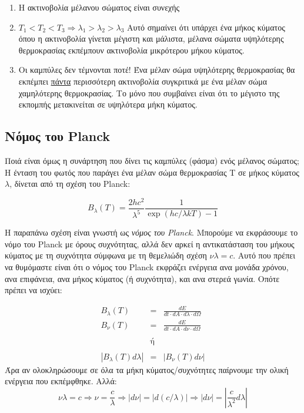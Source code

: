 \begin{enumerate}
    \item Η ακτινοβολία μέλανου σώματος είναι συνεχής
    \item $T_1 < T_2 < T_3 \Rightarrow \lambda_1 > \lambda_2 > \lambda_3$
    Αυτό σημαίνει ότι υπάρχει ένα μήκος κύματος όπου η ακτινοβολία γίνεται μέγιστη και μάλιστα,  μέλανα σώματα υψηλότερης θερμοκρασίας εκπέμπουν ακτινοβολία μικρότερου μήκου κύματος.
    \item Οι καμπύλες δεν τέμνονται ποτέ! Ένα μέλαν σώμα υψηλότερης θερμοκρασίας θα εκπέμπει \underline{πάντα} περισσότερη ακτινοβολία συγκριτικά με ένα μέλαν σώμα χαμηλότερης θερμοκρασίας. Το μόνο που συμβαίνει είναι ότι το μέγιστο της εκπομπής μετακινείται σε υψηλότερα μήκη κύματος.
\end{enumerate}

\subsection{Νόμος του Planck}
Ποιά είναι όμως η συνάρτηση που δίνει τις καμπύλες (φάσμα) ενός μέλανος σώματος;
Η ένταση του φωτός που παράγει ένα μέλαν σώμα θερμοκρασίας Τ σε μήκος κύματος $\lambda$, δίνεται από τη σχέση του Planck:

\begin{equation}
    \label{eq:planck_function_lambda}
    B_{\lambda}(T) = \frac{2hc^2}{\lambda^5} \frac{1}{\exp(hc/\lambda kT) - 1}
\end{equation}

Η παραπάνω σχέση είναι γνωστή ως \textit{νόμος του Planck}. Μπορούμε να εκφράσουμε το νόμο του Planck με όρους συχνότητας, αλλά δεν αρκεί η αντικατάσταση του μήκους κύματος με τη συχνότητα σύμφωνα με τη θεμελιώδη σχέση $\nu \lambda = c$. Αυτό που πρέπει να θυμόμαστε είναι ότι ο νόμος του Planck εκφράζει ενέργεια ανα μονάδα χρόνου, ανα επιφάνεια, ανα μήκος κύματος (ή συχνότητα), και ανα στερεά γωνία. Οπότε πρέπει να ισχύει:

\begin{eqnarray*}
    B_{\lambda} (T) &=& \frac{dE}{dt \cdot dA \cdot d \lambda \cdot d \Omega} \\ 
    B_{\nu} (T) &=& \frac{dE}{dt \cdot dA \cdot d \nu \cdot d \Omega} \\\\
    &\text{ή}& \\\\
    |B_{\lambda} (T) d \lambda | &=& |B_{\nu} (T) d \nu |
\end{eqnarray*}
Άρα αν ολοκληρώσουμε σε όλα τα μήκη κύματος/συχνότητες παίρνουμε την ολική ενέργεια που εκπέμφθηκε. Αλλά: $$\nu \lambda = c \Rightarrow \nu = \frac{c}{\lambda} \Rightarrow |d\nu | = | d \left( c / \lambda \right) | \Rightarrow | d\nu | = \left | \frac{c}{\lambda^2}d\lambda \right |$$


